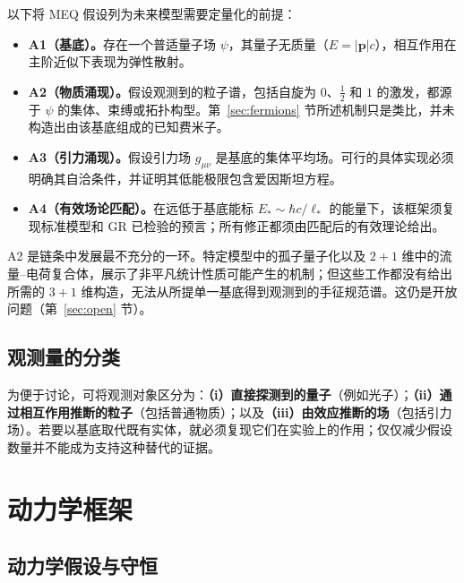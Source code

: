 \documentclass[UTF8,fontset=none,11pt,a4paper]{ctexart}
\begin{document}
以下将 MEQ 假设列为未来模型需要定量化的前提：
\begin{itemize}
\item \textbf{A1（基底）。}存在一个普适量子场 $\psi$，其量子无质量（$E=|\mathbf p|c$），相互作用在主阶近似下表现为弹性散射。
\item \textbf{A2（物质涌现）。}假设观测到的粒子谱，包括自旋为 $0$、$\tfrac12$ 和 $1$ 的激发，都源于 $\psi$ 的集体、束缚或拓扑构型。第~\ref{sec:fermions} 节所述机制只是类比，并未构造出由该基底组成的已知费米子。
\item \textbf{A3（引力涌现）。}假设引力场 $g_{\mu\nu}$ 是基底的集体平均场。可行的具体实现必须明确其自洽条件，并证明其低能极限包含爱因斯坦方程。
\item \textbf{A4（有效场论匹配）。}在远低于基底能标 $E_\ast\sim\hbar c/\ell_\ast$ 的能量下，该框架须复现标准模型和 GR 已检验的预言；所有修正都须由匹配后的有效理论给出。
\end{itemize}
A2 是链条中发展最不充分的一环。特定模型中的孤子量子化以及 $2+1$ 维中的流量--电荷复合体，展示了非平凡统计性质可能产生的机制\cite{Skyrme1962,Goldstone1981,Wilczek1982}；但这些工作都没有给出所需的 $3+1$ 维构造，无法从所提单一基底得到观测到的手征规范谱。这仍是开放问题（第~\ref{sec:open} 节）。

\subsection{观测量的分类}

为便于讨论，可将观测对象区分为：\textbf{（i）直接探测到的量子}（例如光子）；\textbf{（ii）通过相互作用推断的粒子}（包括普通物质）；以及\textbf{（iii）由效应推断的场}（包括引力场）。若要以基底取代既有实体，就必须复现它们在实验上的作用；仅仅减少假设数量并不能成为支持这种替代的证据。

\section{动力学框架}\label{sec:kinetic}

\subsection{动力学假设与守恒}
\end{document}
